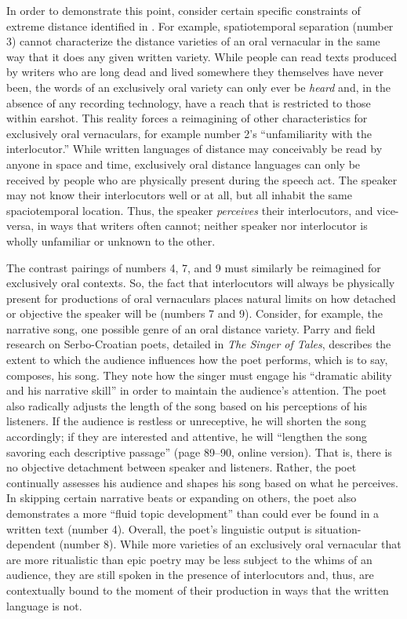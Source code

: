 In order to demonstrate this point, consider certain specific constraints of extreme distance identified in . For example, spatiotemporal separation (number 3) cannot characterize the distance varieties of an oral vernacular in the same way that it does any given written variety. While people can read texts produced by writers who are long dead and lived somewhere they themselves have never been, the words of an exclusively oral variety can only ever be \textit{heard} and, in the absence of any recording technology, have a reach that is restricted to those within earshot. This reality forces a reimagining of other characteristics for exclusively oral vernaculars, for example number 2’s “unfamiliarity with the interlocutor.” While written languages of distance may conceivably be read by anyone in space and time, exclusively oral distance languages can only be received by people who are physically present during the speech act. The speaker may not know their interlocutors well or at all, but all inhabit the same spaciotemporal location. Thus, the speaker \textit{perceives} their interlocutors, and vice-versa, in ways that writers often cannot; neither speaker nor interlocutor is wholly unfamiliar or unknown to the other.

The contrast pairings of numbers 4, 7, and 9 must similarly be reimagined for exclusively oral contexts. So, the fact that interlocutors will always be physically present for productions of oral vernaculars places natural limits on how detached or objective the speaker will be (numbers 7 and 9). Consider, for example, the narrative song, one possible genre of an oral distance variety. Parry and  field research on Serbo-Croatian poets, detailed in \textit{The Singer of Tales}, describes the extent to which the audience influences how the poet performs, which is to say, composes, his song. They note how the singer must engage his “dramatic ability and his narrative skill” in order to maintain the audience’s attention. The poet also radically adjusts the length of the song based on his perceptions of his listeners. If the audience is restless or unreceptive, he will shorten the song accordingly; if they are interested and attentive, he will “lengthen the song savoring each descriptive passage” (page 89--90, online version). That is, there is no objective detachment between speaker and listeners. Rather, the poet continually assesses his audience and shapes his song based on what he perceives. In skipping certain narrative beats or expanding on others, the poet also demonstrates a more “fluid topic development” than could ever be found in a written text (number 4). Overall, the poet’s linguistic output is situation-dependent (number 8). While more varieties of an exclusively oral vernacular that are more ritualistic than epic poetry may be less subject to the whims of an audience, they are still spoken in the presence of interlocutors and, thus, are contextually bound to the moment of their production in ways that the written language is not.

